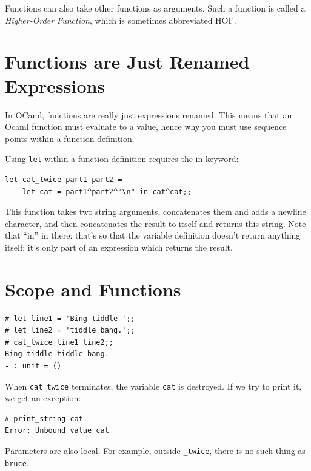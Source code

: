 \documentclass[10pt]{book}
\begin{document}

Functions can also take other functions as arguments. Such a function
is called a {\em Higher-Order Function}, which is sometimes abbreviated HOF.


\section{Functions are Just Renamed Expressions}

In OCaml, functions are really just expressions renamed. This means that an 
Ocaml function must evaluate to a value, hence why you must use sequence points 
within a function definition.

Using {\tt let} within a function definition requires the in keyword:


\beforeverb
\begin{verbatim}
let cat_twice part1 part2 = 
    let cat = part1^part2^"\n" in cat^cat;;
\end{verbatim}
\afterverb
This function takes two string arguments, concatenates them and adds a newline character, 
and then concatenates the result to itself and returns this string. Note that ``in'' in there: that's
so that the variable definition doesn't return anything itself; it's only part of an expression which
returns the result.

\section{Scope and Functions}


\beforeverb
\begin{verbatim}
# let line1 = 'Bing tiddle ';;
# let line2 = 'tiddle bang.';;
# cat_twice line1 line2;;
Bing tiddle tiddle bang.
- : unit = ()
\end{verbatim}
\afterverb

When \verb"cat_twice" terminates, the variable {\tt cat}
is destroyed.  If we try to print it, we get an exception:

\beforeverb
\begin{verbatim}
# print_string cat
Error: Unbound value cat
\end{verbatim}
\afterverb

Parameters are also local.
For example, outside \verb"_twice", there is no
such thing as {\tt bruce}.

\end{document}
